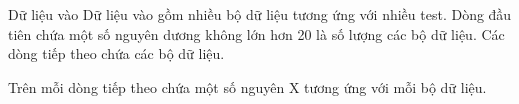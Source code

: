 Dữ liệu vào
Dữ liệu vào gồm nhiều bộ dữ liệu tương ứng với nhiều test. Dòng đầu tiên chứa một số nguyên dương không lớn hơn 20 là số lượng các bộ dữ liệu. Các dòng tiếp theo chứa các bộ dữ liệu.  

   Trên mỗi dòng tiếp theo chứa một số nguyên X tương ứng với mỗi bộ dữ liệu.